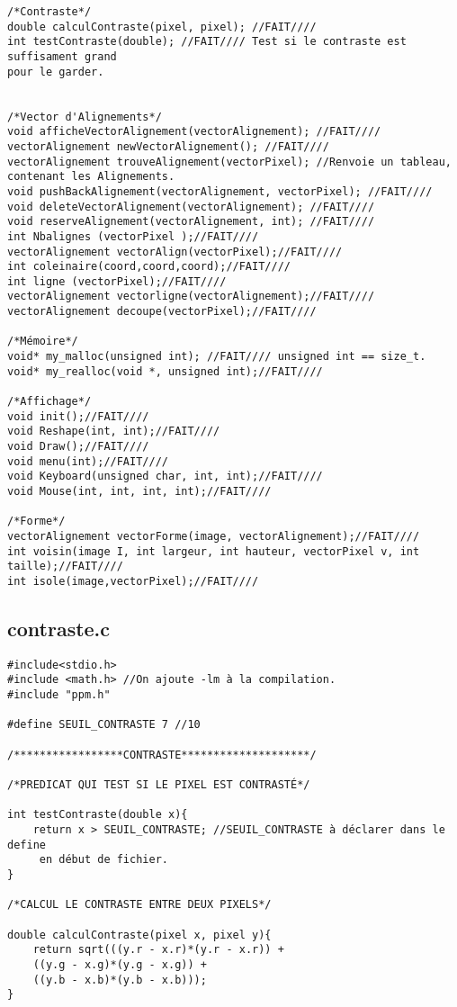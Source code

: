 \documentclass[a4paper , 10pt]{article}
\begin{document}
\begin{verbatim}
/*Contraste*/
double calculContraste(pixel, pixel); //FAIT////
int testContraste(double); //FAIT//// Test si le contraste est suffisament grand 
pour le garder.


/*Vector d'Alignements*/
void afficheVectorAlignement(vectorAlignement); //FAIT////
vectorAlignement newVectorAlignement(); //FAIT////
vectorAlignement trouveAlignement(vectorPixel); //Renvoie un tableau, 
contenant les Alignements.
void pushBackAlignement(vectorAlignement, vectorPixel); //FAIT////
void deleteVectorAlignement(vectorAlignement); //FAIT////
void reserveAlignement(vectorAlignement, int); //FAIT////
int Nbalignes (vectorPixel );//FAIT////
vectorAlignement vectorAlign(vectorPixel);//FAIT////
int coleinaire(coord,coord,coord);//FAIT////
int ligne (vectorPixel);//FAIT////
vectorAlignement vectorligne(vectorAlignement);//FAIT////
vectorAlignement decoupe(vectorPixel);//FAIT////

/*Mémoire*/
void* my_malloc(unsigned int); //FAIT//// unsigned int == size_t.
void* my_realloc(void *, unsigned int);//FAIT////

/*Affichage*/
void init();//FAIT////
void Reshape(int, int);//FAIT////
void Draw();//FAIT////
void menu(int);//FAIT////
void Keyboard(unsigned char, int, int);//FAIT////
void Mouse(int, int, int, int);//FAIT////

/*Forme*/
vectorAlignement vectorForme(image, vectorAlignement);//FAIT////
int voisin(image I, int largeur, int hauteur, vectorPixel v, int taille);//FAIT////
int isole(image,vectorPixel);//FAIT////
\end{verbatim}
\subsection{contraste.c}
\begin{verbatim}
#include<stdio.h>
#include <math.h> //On ajoute -lm à la compilation.
#include "ppm.h"

#define SEUIL_CONTRASTE 7 //10

/*****************CONTRASTE********************/

/*PREDICAT QUI TEST SI LE PIXEL EST CONTRASTÉ*/

int testContraste(double x){
	return x > SEUIL_CONTRASTE; //SEUIL_CONTRASTE à déclarer dans le define
	 en début de fichier.
}

/*CALCUL LE CONTRASTE ENTRE DEUX PIXELS*/

double calculContraste(pixel x, pixel y){
	return sqrt(((y.r - x.r)*(y.r - x.r)) + 
	((y.g - x.g)*(y.g - x.g)) + 
	((y.b - x.b)*(y.b - x.b)));
}
\end{verbatim}
\end{document}
